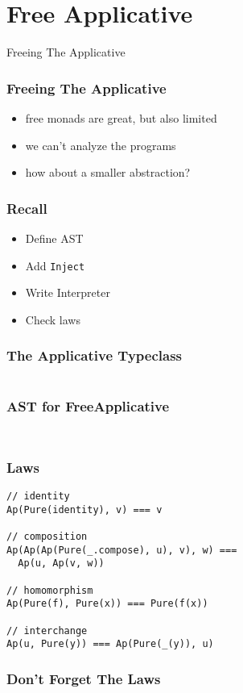 \documentclass{beamer}
\newcommand{\recipe}{%
  \begin{itemize}
  \item Define AST
  \item Add \texttt{Inject}
  \item Write Interpreter
  \item Check laws
  \end{itemize}
}
\begin{document}
\section{Free Applicative}\label{sec:free-applicative}
\begin{frame}
  \begin{center}
    \Huge
    Freeing The Applicative
  \end{center}
\end{frame}

\begin{frame}
  \frametitle{Freeing The Applicative}
  \begin{itemize}
  \item free monads are great, but also limited
  \item we can't analyze the programs
  \item how about a smaller abstraction?
  \end{itemize}
\end{frame}

\begin{frame}
  \frametitle{Recall}
  \recipe{}
\end{frame}

\begin{frame}[fragile]
  \frametitle{The Applicative Typeclass}
  \inputminted{scala}{snippets/applicative-typeclass.scala}
\end{frame}

\begin{frame}[fragile]
  \frametitle{AST for FreeApplicative}
    \inputminted{scala}{snippets/free-applicative.scala}
  \begin{verbatim}
\end{verbatim}
\end{frame}

\begin{frame}[fragile]
  \frametitle{Laws}
\begin{verbatim}
// identity
Ap(Pure(identity), v) === v

// composition
Ap(Ap(Ap(Pure(_.compose), u), v), w) ===
  Ap(u, Ap(v, w))

// homomorphism
Ap(Pure(f), Pure(x)) === Pure(f(x))

// interchange
Ap(u, Pure(y)) === Ap(Pure(_(y)), u)
\end{verbatim}
\end{frame}

\begin{frame}
  \frametitle{Don't Forget The Laws}
\end{frame}
\end{document}

